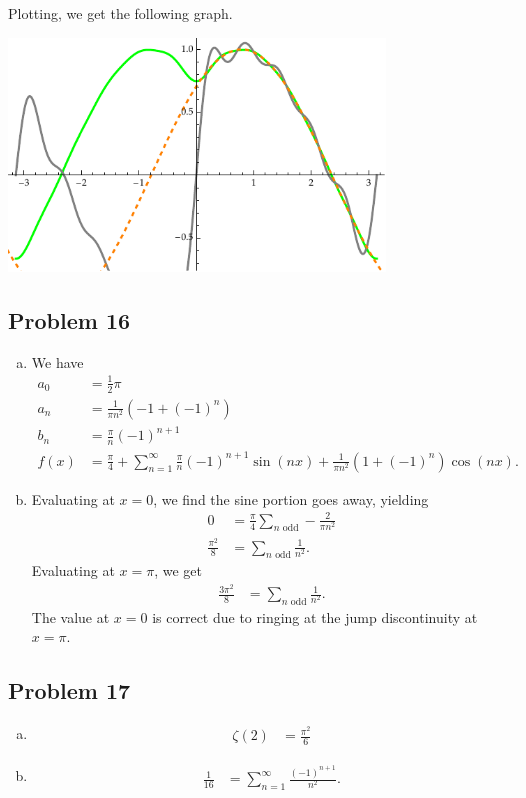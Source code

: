\documentclass[10pt]{mypackage}
\begin{document}
Plotting, we get the following graph.
\begin{center}
  \includegraphics[width=10cm]{images/p_4a_2_33_11.pdf}
\end{center}
\subsection{Problem 16}%
\begin{enumerate}[(a)]
  \item We have
      \begin{align*}
        a_0 &= \frac{1}{2}\pi\\
        a_n &= \frac{1}{\pi n^2}\left(-1 + \left(-1\right)^n\right)\\
        b_n &= \frac{\pi}{n}\left(-1\right)^{n+1}\\
        f(x) &= \frac{\pi}{4} + \sum_{n=1}^{\infty}\frac{\pi}{n}\left(-1\right)^{n+1}\sin\left(n x\right) + \frac{1}{\pi n^2}\left(1 + \left(-1\right)^n\right)\cos\left(n x\right).
      \end{align*}
    \item Evaluating at $x=0$, we find the sine portion goes away, yielding 
      \begin{align*}
        0 &= \frac{\pi}{4}\sum_{n\text{ odd}} -\frac{2}{\pi n^2}\\
        \frac{\pi^2}{8} &= \sum_{n\text{ odd}} \frac{1}{n^2}.
      \end{align*}
      Evaluating at $x = \pi$, we get
      \begin{align*}
        \frac{3\pi^2}{8} &= \sum_{n\text{ odd}}\frac{1}{n^2}.
      \end{align*}
      The value at $x = 0$ is correct due to ringing at the jump discontinuity at $x = \pi$.
\end{enumerate}
\subsection{Problem 17}%
\begin{enumerate}[(a)]
  \item 
    \begin{align*}
      \zeta(2) &= \frac{\pi^2}{6}
    \end{align*}
  \item 
    \begin{align*}
      \frac{1}{16} &= \sum_{n=1}^{\infty}\frac{\left(-1\right)^{n+1}}{n^2}.
    \end{align*}
\end{enumerate}
\end{document}
